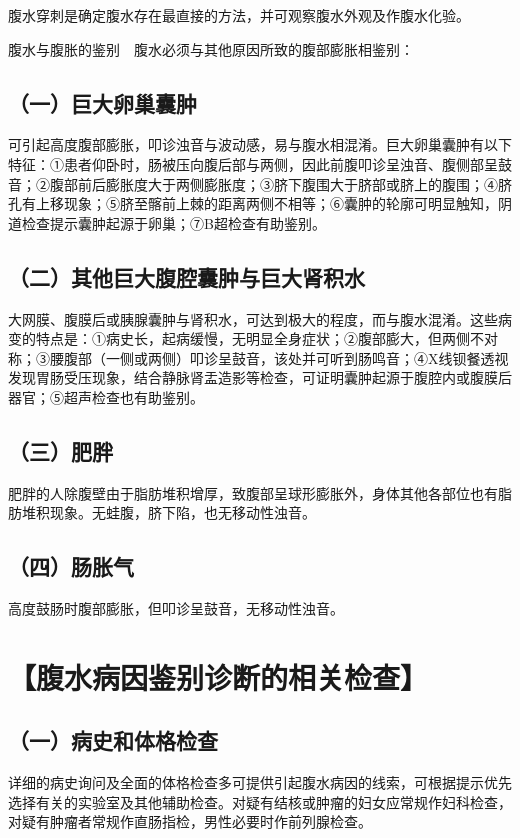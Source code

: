 腹水穿刺是确定腹水存在最直接的方法，并可观察腹水外观及作腹水化验。

腹水与腹胀的鉴别　腹水必须与其他原因所致的腹部膨胀相鉴别：

\subsection{（一）巨大卵巢囊肿}

可引起高度腹部膨胀，叩诊浊音与波动感，易与腹水相混淆。巨大卵巢囊肿有以下特征：①患者仰卧时，肠被压向腹后部与两侧，因此前腹叩诊呈浊音、腹侧部呈鼓音；②腹部前后膨胀度大于两侧膨胀度；③脐下腹围大于脐部或脐上的腹围；④脐孔有上移现象；⑤脐至髂前上棘的距离两侧不相等；⑥囊肿的轮廓可明显触知，阴道检查提示囊肿起源于卵巢；⑦B超检查有助鉴别。

\subsection{（二）其他巨大腹腔囊肿与巨大肾积水}

大网膜、腹膜后或胰腺囊肿与肾积水，可达到极大的程度，而与腹水混淆。这些病变的特点是：①病史长，起病缓慢，无明显全身症状；②腹部膨大，但两侧不对称；③腰腹部（一侧或两侧）叩诊呈鼓音，该处并可听到肠鸣音；④X线钡餐透视发现胃肠受压现象，结合静脉肾盂造影等检查，可证明囊肿起源于腹腔内或腹膜后器官；⑤超声检查也有助鉴别。

\subsection{（三）肥胖}

肥胖的人除腹壁由于脂肪堆积增厚，致腹部呈球形膨胀外，身体其他各部位也有脂肪堆积现象。无蛙腹，脐下陷，也无移动性浊音。

\subsection{（四）肠胀气}

高度鼓肠时腹部膨胀，但叩诊呈鼓音，无移动性浊音。

\section{【腹水病因鉴别诊断的相关检查】}

\subsection{（一）病史和体格检查}

详细的病史询问及全面的体格检查多可提供引起腹水病因的线索，可根据提示优先选择有关的实验室及其他辅助检查。对疑有结核或肿瘤的妇女应常规作妇科检查，对疑有肿瘤者常规作直肠指检，男性必要时作前列腺检查。

